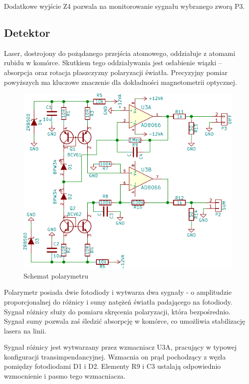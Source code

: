 \documentclass[a4paper,10pt]{article}
\begin{document}
Dodatkowe wyjście Z4 pozwala na monitorowanie sygnału wybranego zworą P3.

\subsection{Detektor}

Laser, dostrojony do pożądanego przejścia atomowego, oddziałuje z atomami rubidu w komórce.
Skutkiem tego oddziaływania jest osłabienie wiązki -- absorpcja oraz rotacja płaszczyzny polaryzacji światła.
Precyzyjny pomiar powyższych ma kluczowe znaczenie dla dokładności magnetometrii optycznej.

\begin{figure}
\begin{center}
 \includegraphics{./obrazki/polarymetr.pdf}
\end{center}
\caption{Schemat polarymetru}
\label{sch-mod}
\end{figure}

Polarymetr posiada dwie fotodiody i wytwarza dwa sygnały - o amplitudzie proporcjonalnej do różnicy i sumy natężeń światła padającego na fotodiody.
Sygnał różnicy służy do pomiaru skręcenia polaryzacji, która bezpośrednio.  Sygnał sumy pozwala zaś śledzić absorpcję w komórce, co umożliwia stabilizację lasera na linii.

Sygnał różnicy jest wytwarzany przez wzmacniacz U3A, pracujący w typowej konfiguracji transimpendancyjnej. Wzmacnia on prąd pochodzący z węzła pomiędzy fotodiodami D1 i D2.
Elementy R9 i C3 ustalają odpowiednio wzmocnienie i pasmo tego wzmacniacza.
\end{document}
